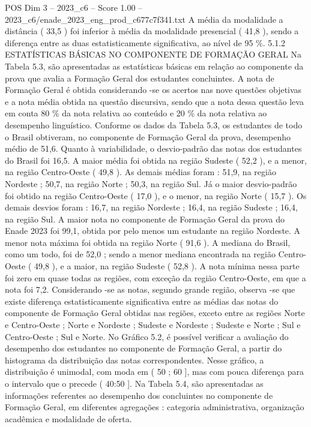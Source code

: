 \begin{textsample}{POS Dim 3 – 2023\_c6 – Score 1.00 – 2023\_c6/enade\_2023\_eng\_prod\_c677c7f341.txt}
A média da modalidade a distância ( 33,5 ) foi inferior à média da modalidade presencial ( 41,8 ), sendo a diferença entre as duas estatisticamente significativa, ao nível de 95 \%. 5.1.2 ESTATÍSTICAS BÁSICAS NO COMPONENTE DE FORMAÇÃO GERAL Na Tabela 5.3, são apresentadas as estatísticas básicas em relação ao componente da prova que avalia a Formação Geral dos estudantes concluintes.
A nota de Formação Geral é obtida considerando -se os acertos nas nove questões objetivas e a nota média obtida na questão discursiva, sendo que a nota dessa questão leva em conta 80 \% da nota relativa ao conteúdo e 20 \% da nota relativa ao desempenho linguístico.
Conforme os dados da Tabela 5.3, os estudantes de todo o Brasil obtiveram, no componente de Formação Geral da prova, desempenho médio de 51,6.
Quanto à variabilidade, o desvio-padrão das notas dos estudantes do Brasil foi 16,5.
A maior média foi obtida na região Sudeste ( 52,2 ), e a menor, na região Centro-Oeste ( 49,8 ).
As demais médias foram : 51,9, na região Nordeste ; 50,7, na região Norte ; 50,3, na região Sul.
Já o maior desvio-padrão foi obtido na região Centro-Oeste ( 17,0 ), e o menor, na região Norte ( 15,7 ).
Os demais desvios foram : 16,7, na região Nordeste ; 16,4, na região Sudeste ; 16,4, na região Sul.
A maior nota no componente de Formação Geral da prova do Enade 2023 foi 99,1, obtida por pelo menos um estudante na região Nordeste.
A menor nota máxima foi obtida na região Norte ( 91,6 ).
A mediana do Brasil, como um todo, foi de 52,0 ; sendo a menor mediana encontrada na região Centro-Oeste ( 49,8 ), e a maior, na região Sudeste ( 52,8 ).
A nota mínima nessa parte foi zero em quase todas as regiões, com exceção da região Centro-Oeste, em que a nota foi 7,2.
Considerando -se as notas, segundo grande região, observa -se que existe diferença estatisticamente significativa entre as médias das notas do componente de Formação Geral obtidas nas regiões, exceto entre as regiões Norte e Centro-Oeste ; Norte e Nordeste ; Sudeste e Nordeste ; Sudeste e Norte ; Sul e Centro-Oeste ; Sul e Norte.
No Gráfico 5.2, é possível verificar a avaliação do desempenho dos estudantes no componente de Formação Geral, a partir do histograma da distribuição das notas correspondentes.
Nesse gráfico, a distribuição é unimodal, com moda em ( 50 ; 60 ], mas com pouca diferença para o intervalo que o precede ( 40:50 ].
Na Tabela 5.4, são apresentadas as informações referentes ao desempenho dos concluintes no componente de Formação Geral, em diferentes agregações : categoria administrativa, organização acadêmica e modalidade de oferta.

\end{textsample}
